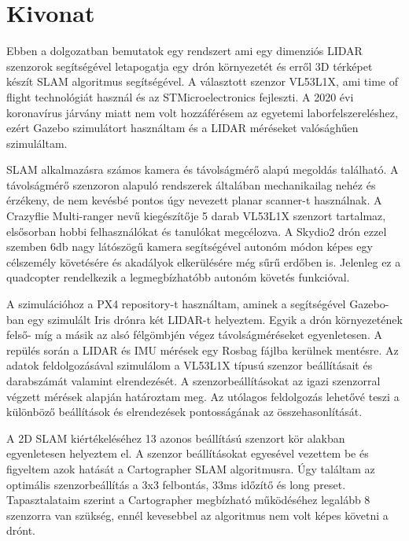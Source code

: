 \setcounter{page}{1}

\selecthungarian

\chapter*{Kivonat}
Ebben a dolgozatban bemutatok egy rendszert ami egy dimenziós LIDAR szenzorok segítségével letapogatja
egy drón környezetét és erről 3D térképet készít SLAM algoritmus segítségével. A választott szenzor VL53L1X, ami
time of flight technológiát használ és az STMicroelectronics fejleszti. A 2020 évi koronavírus járvány miatt
nem volt hozzáférésem az egyetemi laborfelszereléshez, ezért Gazebo szimulátort használtam és a LIDAR méréseket
valósághűen szimuláltam.

SLAM alkalmazásra számos kamera és távolságmérő alapú megoldás található. A távolságmérő szenzoron alapuló
rendszerek általában mechanikailag nehéz és érzékeny, de nem kevésbé pontos úgy nevezett planar scanner-t 
használnak. A Crazyflie Multi-ranger nevű kiegészítője 5 darab VL53L1X szenzort tartalmaz, elsősorban 
hobbi felhasználókat és tanulókat megcélozva. A Skydio2 drón ezzel szemben 6db nagy látószögű kamera 
segítségével autonóm módon képes egy célszemély követésére és akadályok elkerülésére még sűrű erdőben is. 
Jelenleg ez a quadcopter rendelkezik a legmegbízhatóbb autonóm követés funkcióval.

A szimulációhoz a PX4 repository-t használtam, aminek a segítségével Gazebo-ban egy szimulált Iris drónra 
két LIDAR-t helyeztem. Egyik a drón környezetének felső- míg a másik az alsó félgömbjén végez távolságméréseket
egyenletesen. A repülés során a LIDAR és IMU mérések egy Rosbag fájlba kerülnek mentésre. Az adatok feldolgozásával
szimulálom a VL53L1X típusú szenzor beállításait és darabszámát valamint elrendezését. A szenzorbeállításokat
az igazi szenzorral végzett mérések alapján határoztam meg. Az utólagos feldolgozás lehetővé teszi a 
különböző beállítások és elrendezések pontosságának az összehasonlítását.

A 2D SLAM kiértékeléséhez 13 azonos beállítású szenzort kör alakban egyenletesen helyeztem el. A szenzor 
beállításokat egyesével vezettem be és figyeltem azok hatását a Cartographer SLAM algoritmusra. Úgy találtam
az optimális szenzorbeállítás a 3x3 felbontás, 33ms időzítő és long preset. Tapasztalataim szerint a 
Cartographer megbízható működéséhez legalább 8 szenzorra van szükség, ennél kevesebbel az algoritmus
nem volt képes követni a drónt.

